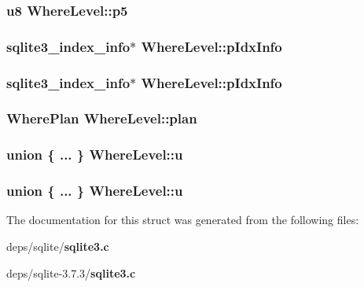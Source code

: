 \subsubsection{\setlength{\rightskip}{0pt plus 5cm}\bf{u8} \bf{Where\-Level::p5}}\label{structWhereLevel_033f0ef1d878c3ea118ee19f8f6d7999}


\subsubsection{\setlength{\rightskip}{0pt plus 5cm}\bf{sqlite3\_\-index\_\-info}$\ast$ \bf{Where\-Level::p\-Idx\-Info}}\label{structWhereLevel_feb6a149029de3b97b51df7494fd5ef0}


\subsubsection{\setlength{\rightskip}{0pt plus 5cm}\bf{sqlite3\_\-index\_\-info}$\ast$ \bf{Where\-Level::p\-Idx\-Info}}\label{structWhereLevel_feb6a149029de3b97b51df7494fd5ef0}


\subsubsection{\setlength{\rightskip}{0pt plus 5cm}\bf{Where\-Plan} \bf{Where\-Level::plan}}\label{structWhereLevel_3accbf71eef0c2e93ac3d195d5b46a16}


\subsubsection{\setlength{\rightskip}{0pt plus 5cm}union \{ ... \}   \bf{Where\-Level::u}}\label{structWhereLevel_2fdb722fd4048e72171b9e1befca5ba5}


\subsubsection{\setlength{\rightskip}{0pt plus 5cm}union \{ ... \}   \bf{Where\-Level::u}}\label{structWhereLevel_f783b7dfa513094ace97a7bf15ad6fc7}




The documentation for this struct was generated from the following files:\begin{CompactItemize}
\item 
deps/sqlite/\bf{sqlite3.c}\item 
deps/sqlite-3.7.3/\bf{sqlite3.c}\end{CompactItemize}
